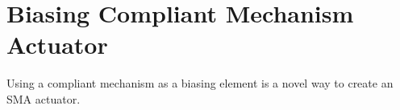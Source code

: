 \chapter{Biasing Compliant Mechanism Actuator}
Using a compliant mechanism as a biasing element is a novel way to create an SMA actuator.
